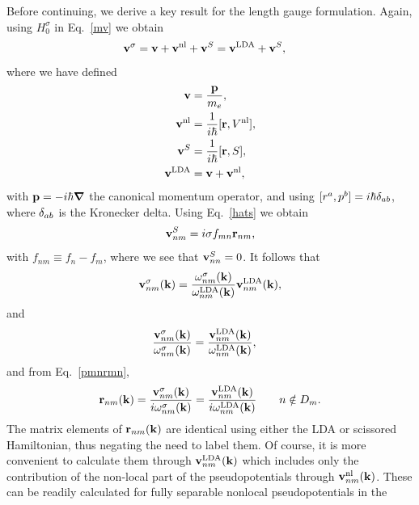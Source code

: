 \documentclass[floatfix,prb,aps,superscriptaddress,11pt,preprint,letterpaper]{revtex4}
\def\chon{black}
\begin{document}
Before {\color{\chon} continuing,} 
we derive a key result for the length gauge formulation. 
{\color{\chon} Again, using} $H^\sigma_0$ in
Eq.~\eqref{mv} we obtain
\begin{align}\label{vop2}
\mathbf{v}^\sigma&=
\mathbf{v} 
+
\mathbf{v}^{\mathrm{nl}} 
+\mathbf{v}^S
=
\mathbf{v}^{\mathrm{LDA}} 
+\mathbf{v}^S 
,
\end{align}
where we have defined 
\begin{subequations}
\begin{align}\label{ve}
\mathbf{v} 
&=\frac{\mathbf{p}}{m_e},
\\\label{vnl}
\mathbf{v}^{\mathrm{nl}} 
&=
\frac{1}{i\hbar}[\mathbf{r},V^{\mathrm{nl}}],
\\\label{vs}
\mathbf{v}^S
&=
\frac{1}{i\hbar}[\mathbf{r}, S],
\\\label{vlda}
\mathbf{v}^{\mathrm{LDA}} 
&=
\mathbf{v} 
+\mathbf{v}^{\mathrm{nl}}
,
\end{align}  
\end{subequations}
with $\mathbf{p}=-i\hbar\boldsymbol{\nabla}$ the canonical momentum operator{\color{\chon}, 
and using $[r^a,p^b]=i\hbar\delta_{ab}$, where $\delta_{ab}$ is the Kronecker} delta.
Using Eq.~\eqref{hats} we obtain 
\begin{equation}\label{chon.2} 
\mathbf{v}^S_{nm}=i\sigma f_{mn}\mathbf{r}_{nm},
\end{equation}
with $f_{nm}\equiv f_n-f_m$,
where we see that $\mathbf{v}^S_{nn}=0$. {\color{\chon} It} follows that
\begin{align}\label{chon.9}
\mathbf{v}^\sigma_{nm}(\mathbf{k}) 
=\frac{\omega^\sigma_{nm}(\mathbf{k})}{\omega^{\mathrm{LDA}}_{nm}(\mathbf{k})}
\mathbf{v}^{\mathrm{LDA}}_{nm}(\mathbf{k}) 
,
\end{align}
and
 \begin{align}\label{chon.8}
\frac{\mathbf{v}^\sigma_{nm}(\mathbf{k})}{\omega^\sigma_{nm}(\mathbf{k})}
&=
\frac{\mathbf{v}^{\mathrm{LDA}}_{nm}(\mathbf{k})}{\omega^{\mathrm{LDA}}_{nm}(\mathbf{k})}
,
\end{align}
{\color{\chon} and from Eq.~\eqref{pmnrmn},} 
\begin{align}\label{chon.10}
\mathbf{r}_{nm}(\mathbf{k}) 
=
\frac{\mathbf{v}^\sigma_{nm}(\mathbf{k})}{i\omega^\sigma_{nm}(\mathbf{k})}
=
\frac{\mathbf{v}^{\mathrm{LDA}}_{nm}(\mathbf{k})}{i\omega^{\mathrm{LDA}}_{nm}(\mathbf{k})}
\quad\quad n\notin D_m 
. 
\end{align}
The matrix elements 
of $\mathbf{r}_{nm}(\mathbf{k})$ are {\color{\chon} identical using either} 
the LDA or {\color{\chon} scissored} 
Hamiltonian, {\color{\chon} thus negating the} need to label them.
Of course, {\color{\chon} it} is more convenient to calculate them
through $\mathbf{v}^{\mathrm{LDA}}_{nm}(\mathbf{k})$ {\color{\chon} which 
includes} only the contribution of 
the non-local part of the pseudopotentials through
$\mathbf{v}^{\mathrm{nl}}_{nm}(\mathbf{k})$. These {\color{\chon} can} be readily
calculated
for 
fully separable nonlocal pseudopotentials in the 
\end{document}
